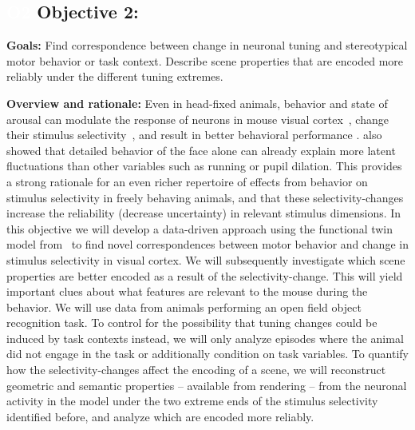 \documentclass[B2,COG]{ercgrant}
\begin{document}
\subsection{\colorbox{obj2}{\textcolor{white}{O2}} Objective 2: \otwotitle}


\textbf{Goals:} Find correspondence between change in neuronal tuning and stereotypical motor behavior or task context.
Describe scene properties that are encoded more reliably under the different tuning extremes. 

\textbf{Overview and rationale:} 
Even in head-fixed animals, behavior and state of arousal can modulate the response of neurons in mouse visual cortex~\parencite{Niell2010-bs, Stringer2019-lt, Musall2019-kd}, change their stimulus selectivity~\parencite{Franke2022-do,Chiappe2010-bm, Bezdudnaya2006-ge,Treue1996-lp, Andermann2011-vw}, and result in better behavioral performance \parencite{Spitzer1988-kq, Bennett2013-rk, Dadarlat2017-jw, De_Gee2022-ir}.
\textcite{Stringer2019-lt} also showed that detailed behavior of the face alone can already explain more latent fluctuations than other variables such as running or pupil dilation.
This provides a strong rationale for an even richer repertoire of effects from behavior on stimulus selectivity in freely behaving animals, and that these selectivity-changes increase the reliability (decrease uncertainty) in relevant stimulus dimensions. 
In this objective we will develop a data-driven approach using the functional twin model from~ to find novel correspondences between motor behavior and change in stimulus selectivity in visual cortex. 
We will subsequently investigate which scene properties are better encoded as a result of the selectivity-change.
This will yield important clues about what features are relevant to the mouse during the behavior. 
We will use data from animals performing an open field object recognition task. 
To control for the possibility that tuning changes could be induced by task contexts instead, we will only analyze episodes where the animal did not engage in the task or additionally condition on task variables. 
To quantify how the selectivity-changes affect the encoding of a scene, we will reconstruct geometric and semantic properties -- available from rendering -- from the neuronal activity in the model under the two extreme ends of the stimulus selectivity identified before, and analyze which are encoded more reliably. 
\end{document}
